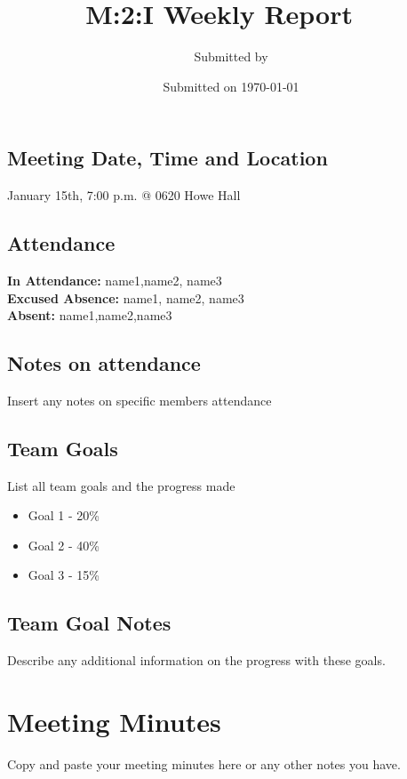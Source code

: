 \documentclass[10pt,a4paper]{article}
\author{Submitted by \teamLeader}
\title{M:2:I Weekly Report \ \\ \teamName}
\date{Submitted on \today}
\begin{document}
\maketitle
\begin{framed}
\section*{Meeting Date, Time and Location}
January 15th, 7:00 p.m. @ 0620 Howe Hall
\end{framed}
\begin{framed}
\section*{Attendance}
\textbf{In Attendance:} name1,name2, name3 \ \\
\textbf{Excused Absence:} name1, name2, name3 \ \\
\textbf{Absent:} name1,name2,name3
\subsection*{Notes on attendance}
Insert any notes on specific members attendance
\end{framed}
\begin{framed}
\section*{Team Goals}
List all team goals and the progress made
\begin{itemize}
\item Goal 1 - 20\%
\item Goal 2 - 40\%
\item Goal 3 - 15\%
\end{itemize}
\subsection*{Team Goal Notes}
Describe any additional information on the progress with these goals.
\end{framed}
\section*{Meeting Minutes}
Copy and paste your meeting minutes here or any other notes you have.
\end{document}
